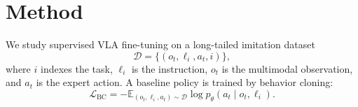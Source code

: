 \section{Method}
\label{sec:method}

We study supervised VLA fine-tuning on a long-tailed imitation dataset
\begin{equation}
  \mathcal{D} = \{(o_t, \ell_i, a_t, i)\},
\end{equation}
where $i$ indexes the task, $\ell_i$ is the instruction, $o_t$ is the multimodal observation, and $a_t$ is the expert action. A baseline policy is trained by behavior cloning:
\begin{equation}
  \mathcal{L}_{\mathrm{BC}}
  = - \mathbb{E}_{(o_t,\ell_i,a_t) \sim \mathcal{D}}
  \log p_\theta(a_t \mid o_t,\ell_i).
\end{equation}

